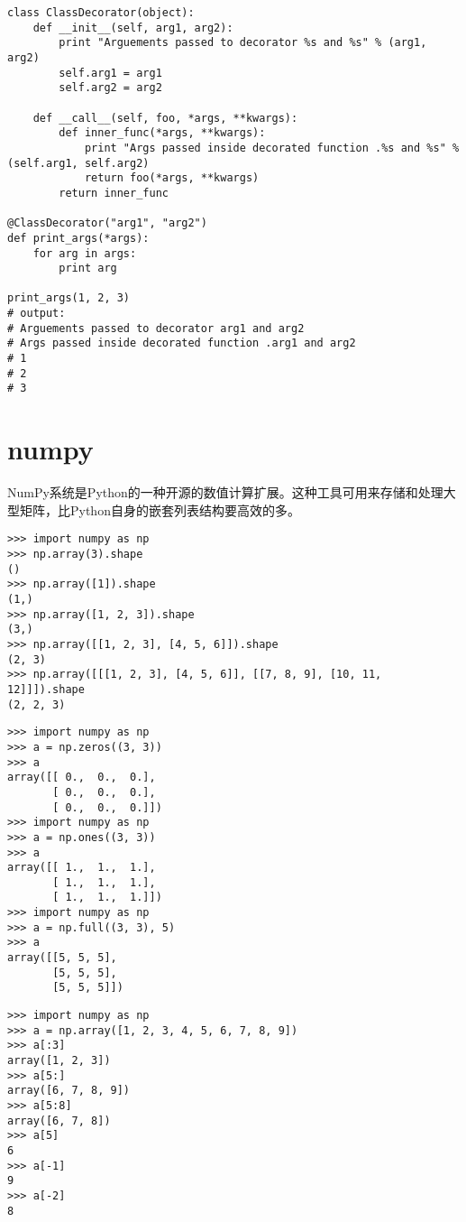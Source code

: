\documentclass[10pt,a4paper]{ctexbook}
\begin{document}
\begin{verbatim}
class ClassDecorator(object):
    def __init__(self, arg1, arg2):
        print "Arguements passed to decorator %s and %s" % (arg1, arg2)
        self.arg1 = arg1
        self.arg2 = arg2

    def __call__(self, foo, *args, **kwargs):
        def inner_func(*args, **kwargs):
            print "Args passed inside decorated function .%s and %s" % (self.arg1, self.arg2)
            return foo(*args, **kwargs)
        return inner_func

@ClassDecorator("arg1", "arg2")
def print_args(*args):
    for arg in args:
        print arg

print_args(1, 2, 3)
# output:
# Arguements passed to decorator arg1 and arg2
# Args passed inside decorated function .arg1 and arg2
# 1
# 2
# 3
\end{verbatim}

\section{numpy}
NumPy系统是Python的一种开源的数值计算扩展。这种工具可用来存储和处理大型矩阵，比Python自身的嵌套列表结构要高效的多。

\begin{verbatim}
>>> import numpy as np
>>> np.array(3).shape
()
>>> np.array([1]).shape
(1,)
>>> np.array([1, 2, 3]).shape
(3,)
>>> np.array([[1, 2, 3], [4, 5, 6]]).shape
(2, 3)
>>> np.array([[[1, 2, 3], [4, 5, 6]], [[7, 8, 9], [10, 11, 12]]]).shape
(2, 2, 3)
\end{verbatim}

\begin{verbatim}
>>> import numpy as np
>>> a = np.zeros((3, 3))
>>> a
array([[ 0.,  0.,  0.],
       [ 0.,  0.,  0.],
       [ 0.,  0.,  0.]])
>>> import numpy as np
>>> a = np.ones((3, 3))
>>> a
array([[ 1.,  1.,  1.],
       [ 1.,  1.,  1.],
       [ 1.,  1.,  1.]])
>>> import numpy as np
>>> a = np.full((3, 3), 5)
>>> a
array([[5, 5, 5],
       [5, 5, 5],
       [5, 5, 5]])
\end{verbatim}


\begin{verbatim}
>>> import numpy as np
>>> a = np.array([1, 2, 3, 4, 5, 6, 7, 8, 9])
>>> a[:3]
array([1, 2, 3])
>>> a[5:]
array([6, 7, 8, 9])
>>> a[5:8]
array([6, 7, 8])
>>> a[5]
6
>>> a[-1]
9
>>> a[-2]
8
\end{verbatim}
\end{document}
